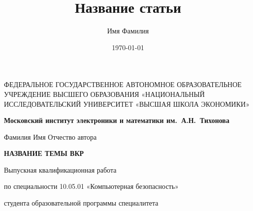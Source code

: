 \documentclass[a4paper,12pt, landscape]{report}
\author{Имя Фамилия}
\title{Название статьи}
\date{\today}
\begin{document}
\thispagestyle{empty}
\begin{center}
\sc
ФЕДЕРАЛЬНОЕ  ГОСУДАРСТВЕННОЕ АВТОНОМНОЕ
ОБРАЗОВАТЕЛЬНОЕ УЧРЕЖДЕНИЕ ВЫСШЕГО ОБРАЗОВАНИЯ
«НАЦИОНАЛЬНЫЙ ИССЛЕДОВАТЕЛЬСКИЙ УНИВЕРСИТЕТ
«ВЫСШАЯ ШКОЛА ЭКОНОМИКИ»
\end{center}

\begin{center}
\bf Московский институт электроники и математики им.~А.Н.~Тихонова
\end{center}

\vspace{1cm}

\begin{center}
Фамилия Имя Отчество автора
\end{center}

\vspace{1cm}

\begin{center}
\bf НАЗВАНИЕ ТЕМЫ ВКР
\end{center}

\vspace{1cm}

\begin{center}
Выпускная квалификационная работа \par
по специальности 10.05.01 «Компьютерная безопасность» \par
студента образовательной программы специалитета
\end{center}

\vfill
\end{document}
